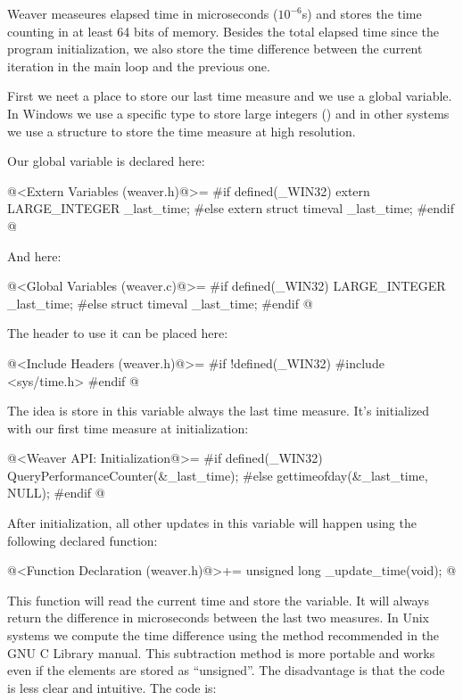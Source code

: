 
Weaver measeures elapsed time in microseconds ($10^{-6}$s) and stores
the time counting in at least 64 bits of memory. Besides the total
elapsed time since the program initialization, we also store the time
difference between the current iteration in the main loop and the
previous one.

First we neet a place to store our last time measure and we use a
global variable. In Windows we use a specific type to store large
integers () and in other systems we use a
 structure to store the time measure at high
resolution.

Our global variable is declared here:

\iniciocodigo
@<Extern Variables (weaver.h)@>=
#if defined(_WIN32)
extern LARGE_INTEGER _last_time;
#else
extern struct timeval _last_time;
#endif
@
\fimcodigo

And here:

\iniciocodigo
@<Global Variables (weaver.c)@>=
#if defined(_WIN32)
LARGE_INTEGER _last_time;
#else
struct timeval _last_time;
#endif
@
\fimcodigo

The header to use it can be placed here:

\iniciocodigo
@<Include Headers (weaver.h)@>=
#if !defined(_WIN32)
#include <sys/time.h>
#endif
@
\fimcodigo

The idea is store in this variable always the last time measure. It's
initialized with our first time measure at initialization:

\iniciocodigo
@<Weaver API: Initialization@>=
#if defined(_WIN32)
QueryPerformanceCounter(&_last_time);
#else
gettimeofday(&_last_time, NULL);
#endif
@
\fimcodigo

After initialization, all other updates in this variable will happen
using the following declared function:

\iniciocodigo
@<Function Declaration (weaver.h)@>+=
unsigned long _update_time(void);
@
\fimcodigo

This function will read the current time and store the variable. It
will always return the difference in microseconds between the last two
measures. In Unix systems we compute the time difference using the
method recommended in the GNU C Library manual. This subtraction
method is more portable and works even if the 
elements are stored as ``unsigned''. The disadvantage is that the code
is less clear and intuitive. The code is:


